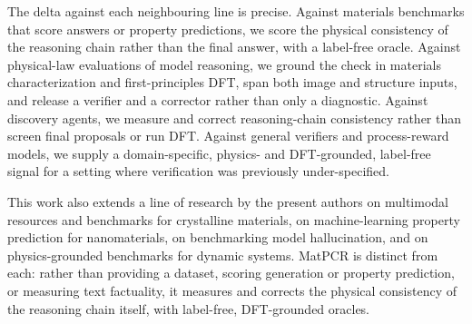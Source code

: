 \documentclass[pdflatex,sn-nature]{sn-jnl}
\begin{document}
The delta against each neighbouring line is precise. Against materials benchmarks
that score answers or property predictions,\cite{lai2025materials,llm4matbench2024,atomworld2025,matterchat2026}
we score the physical consistency of the reasoning chain rather than the final
answer, with a label-free oracle. Against physical-law evaluations of model
reasoning,\cite{conservationbench2026,p1vl2026} we ground the check in materials
characterization and first-principles DFT, span both image and structure inputs, and
release a verifier and a corrector rather than only a diagnostic. Against discovery
agents,\cite{dreams2025,physrej2025} we measure and correct reasoning-chain
consistency rather than screen final proposals or run DFT. Against general verifiers
and process-reward models,\cite{processbench2025,compassverifier2025,t1verify2025} we
supply a domain-specific, physics- and DFT-grounded, label-free signal for a setting
where verification was previously under-specified.

This work also extends a line of research by the present authors on multimodal
resources and benchmarks for crystalline
materials,\cite{polat2025crysmtm,polat2025rcrystals} on machine-learning property
prediction for nanomaterials,\cite{polat2025quantumshellnet,polat2024multimodalnp} on
benchmarking model hallucination,\cite{abdaljalil2025halluverse} and on
physics-grounded benchmarks for dynamic systems.\cite{khanbayov2026iris} MatPCR is
distinct from each: rather than providing a dataset, scoring generation or property
prediction, or measuring text factuality, it measures and corrects the physical
consistency of the reasoning chain itself, with label-free, DFT-grounded oracles.
\end{document}
